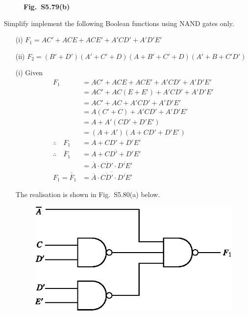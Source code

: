 \begin{solution}
\begin{itemize}
\begin{figure}[H]
\smallskip
{\bf Fig.~S5.79(b)}
\end{figure}
\end{itemize}
\end{solution}

\begin{problem}\label{prob5.80}
Simplify implement the following Boolean functions using NAND gates only.
\begin{itemize}
\item[(i)] $F_{1}=AC'+ACE+ACE'+A'CD'+A'D'E'$

\item[(ii)] $F_{2}=(B'+D')(A'+C'+D)(A+B'+C'+D)(A'+B+C'D')$
\end{itemize}
\end{problem}

\begin{solution}
\begin{itemize}
\item[(i)] Given
\begin{align*}
F_{1} &= AC'+ACE+ACE'+A'CD'+A'D'E'\\[5pt]
&= AC'+AC(E+E')+A'CD'+A'D'E'\\[5pt]
&= AC'+AC+A'CD'+A'D'E'\\[5pt]
&= A(C'+C)+A'CD'+A'D'E'\\[5pt]
&= A+A'(CD'+D'E')\\[5pt]
&= (A+A')(A+CD'+D'E')\\[5pt]
\therefore\quad F_{1} &= A+CD'+D'E'\\[5pt]
\therefore\quad \overline{F}_{1} &= \overline{A+CD'+D'E'}\\[5pt]
&= \overline{A}\cdot \overline{CD'}\cdot \overline{D'E'}\\[5pt]
F_{1}=\overline{\overline{F}}_{1} &= \overline{\overline{A}\cdot \overline{CD'}\cdot \overline{D'E'}}
\end{align*}

\eject

The realisation is shown in Fig.~S5.80(a) below.
\begin{figure}[H]
\centering
\includegraphics[scale=1.15]{chap5/figS9.eps}


\end{figure}
\end{itemize}
\end{solution}
